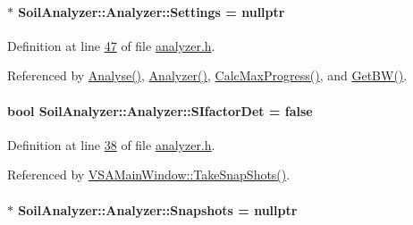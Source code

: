 \hypertarget{class_soil_analyzer_1_1_analyzer_a0a17b8f11ce60cd5b22d03b9925ee16e}{}
\paragraph[{Settings}]{$\ast$ Soil\+Analyzer\+::\+Analyzer\+::\+Settings = nullptr}\label{class_soil_analyzer_1_1_analyzer_a0a17b8f11ce60cd5b22d03b9925ee16e}


Definition at line \hyperlink{analyzer_8h_source_l00047}{47} of file \hyperlink{analyzer_8h_source}{analyzer.\+h}.



Referenced by \hyperlink{analyzer_8cpp_source_l00054}{Analyse()}, \hyperlink{analyzer_8cpp_source_l00018}{Analyzer()}, \hyperlink{analyzer_8cpp_source_l00112}{Calc\+Max\+Progress()}, and \hyperlink{analyzer_8cpp_source_l00236}{Get\+B\+W()}.

\hypertarget{class_soil_analyzer_1_1_analyzer_a144dea5736f2c1e2d86c9f655910be1f}{}
\paragraph[{S\+Ifactor\+Det}]{\setlength{\rightskip}{0pt plus 5cm}bool Soil\+Analyzer\+::\+Analyzer\+::\+S\+Ifactor\+Det = false}\label{class_soil_analyzer_1_1_analyzer_a144dea5736f2c1e2d86c9f655910be1f}


Definition at line \hyperlink{analyzer_8h_source_l00038}{38} of file \hyperlink{analyzer_8h_source}{analyzer.\+h}.



Referenced by \hyperlink{vsamainwindow_8cpp_source_l00391}{V\+S\+A\+Main\+Window\+::\+Take\+Snap\+Shots()}.

\hypertarget{class_soil_analyzer_1_1_analyzer_a483f7f65076cdbafe109ddfdfa2a0640}{}
\paragraph[{Snapshots}]{$\ast$ Soil\+Analyzer\+::\+Analyzer\+::\+Snapshots = nullptr}\label{class_soil_analyzer_1_1_analyzer_a483f7f65076cdbafe109ddfdfa2a0640}


